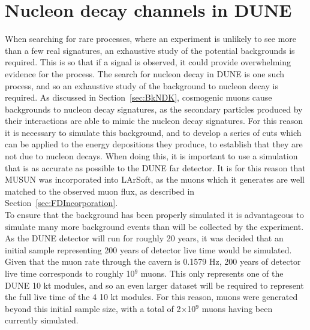 \section{Nucleon decay channels in DUNE} \label{sec:DUNENDK} %
When searching for rare processes, where an experiment is unlikely to see more than a few real signatures, an exhaustive study of the potential backgrounds is required. This is so that if a signal is observed, it could provide overwhelming evidence for the process. The search for nucleon decay in DUNE is one such process, and so an exhaustive study of the background to nucleon decay is required. As discussed in Section~\ref{sec:BkNDK}, cosmogenic muons cause backgrounds to nucleon decay signatures, as the secondary particles produced by their interactions are able to mimic the nucleon decay signatures. For this reason it is necessary to simulate this background, and to develop a series of cuts which can be applied to the energy depositions they produce, to establish that they are not due to nucleon decays. When doing this, it is important to use a simulation that is as accurate as possible to the DUNE far detector. It is for this reason that MUSUN was incorporated into LArSoft, as the muons which it generates are well matched to the observed muon flux, as described in Section~\ref{sec:FDIncorporation}. \\

To ensure that the background has been properly simulated it is advantageous to simulate many more background events than will be collected by the experiment. As the DUNE detector will run for roughly 20 years, it was decided that an initial sample representing 200 years of detector live time would be simulated. Given that the muon rate through the cavern is 0.1579 Hz, 200 years of detector live time corresponds to roughly 10$^9$ muons. This only represents one of the DUNE 10 kt modules, and so an even larger dataset will be required to represent the full live time of the 4 10 kt modules. For this reason, muons were generated beyond this initial sample size, with a total of 2$\times$10$^9$ muons having been currently simulated. \\

